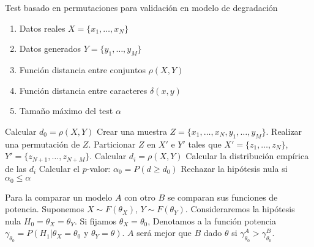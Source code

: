 \begin{algorithm}
	\caption{Test basado en permutaciones para validación en 
			modelo de degradación}
	\label{alg:CMC-digitalizacion}
	\begin{algorithmic}[1]
	\REQUIRE
		\begin{enumerate}[a]
		\item Datos reales $X = \{ x_1, \dots, x_N \}$
		\item Datos generados $Y = \{ y_1, \dots, y_M \}$
		\item Función distancia entre conjuntos $\rho(X,Y)$
		\item Función distancia entre caracteres $\delta(x,y)$
		\item Tamaño máximo del test $\alpha$
		\end{enumerate}
		\STATE Calcular $d_0 = \rho(X,Y)$
		\STATE Crear una muestra 
			$Z= \{x_1, \dots, x_N, y_1, \dots, y_M \}$.
			\STATE Realizar una permutación de $Z$.
			\STATE Particionar $Z$ en $X'$ e $Y'$ tales que 
				$X' = \{ z_1, \dots, z_N \}$, $Y' = 
				\{ z_{N+1}, \dots, z_{N+M} \} $.
			\STATE Calcular $d_i = \rho(X,Y)$
		\ENDFOR
		\STATE Calcular la distribución empírica de las $d_i$
		\STATE Calcular el $p$-valor: 
			$\alpha_0 = P(d \geq d_0)$
		\STATE Rechazar la hipótesis nula si 
			$\alpha_0 \leq \alpha$
	\end{algorithmic}
\end{algorithm}

	Para la comparar un modelo $A$ con otro $B$ se comparan 
sus funciones de potencia. Suponemos $X \sim F(\theta_X)
$, $Y \sim F(\theta_Y)$. Consideraremos la hipótesis nula 
$H_0 = \theta_X = \theta_Y$. Si fijamos $\theta_X= \theta_0$, 
Denotamos a la función potencia $\gamma_{\theta_0}= 
P(H_1 | \theta_X = \theta_0 \text{ y } \theta_Y = \theta)$. 
$A$ será mejor que $B$ dado $\theta$ si $\gamma_{\theta_0}^A  
> \gamma_{\theta_0}^B$.
	
